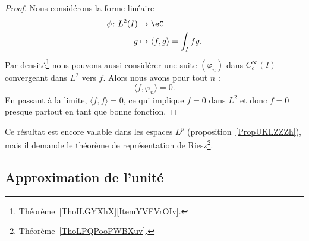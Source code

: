 \begin{proof}
	Nous considérons la forme linéaire
	\begin{equation}
		\begin{aligned}
			\phi\colon L^2(I) & \to \eC                                     \\
			g                 & \mapsto \langle f, g\rangle=\int_If\bar g .
		\end{aligned}
	\end{equation}
	Par densité\footnote{Théorème~\ref{ThoILGYXhX}\ref{ItemYVFVrOIv}.} nous pouvons aussi considérer une suite \( (\varphi_n)\) dans \(  C^{\infty}_c(I)\) convergeant dans \( L^2\) vers \( f\). Alors nous avons pour tout \( n\) :
	\begin{equation}
		\langle f, \varphi_n\rangle =0.
	\end{equation}
	En passant à la limite, \( \langle f, f\rangle =0\), ce qui implique \( f=0\) dans \( L^2\) et donc \( f=0\) presque partout en tant que bonne fonction.
\end{proof}
Ce résultat est encore valable dans les espaces \( L^p\) (proposition~\ref{PropUKLZZZh}), mais il demande le théorème de représentation de Riesz\footnote{Théorème~\ref{ThoLPQPooPWBXuv}.}.

\subsection{Approximation de l'unité}


